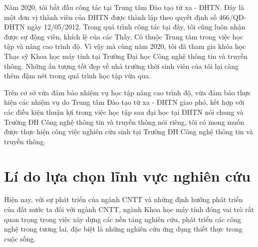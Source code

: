 Năm 2020, tôi bắt đầu công tác tại Trung tâm Đào tạo từ xa - ĐHTN. Đây là một đơn vị thành viên của ĐHTN được thành lập theo quyết định số 466/QĐ-ĐHTN ngày 12/05/2012. Trong quá trình công tác tại đây, tôi cũng luôn nhận được sự động viên, khích lệ của các Thầy, Cô thuộc Trung tâm trong việc học tập và nâng cao trình độ. Vì vậy mà cùng năm 2020, tôi đã tham gia khóa học Thạc sỹ Khoa học máy tính tại Trường Đại học Công nghệ thông tin và truyền thông. Những ấn tượng tốt đẹp về nhà trường thời sinh viên của tôi lại càng thêm đậm nét trong quá trình học tập vừa qua. 

Trên cơ sở vừa đảm bảo nhiệm vụ học tập nâng cao trình độ, vừa đảm bảo thực hiện các nhiệm vụ do Trung tâm Đào tạo từ xa - ĐHTN giao phó, kết hợp với các điều kiện thuận lợi trong việc học tập sau đại học tại ĐHTN nói chung và Trường ĐH Công nghệ thông tin và truyền thông nói riêng, tôi có mong muốn được thực hiện công việc nghiên cứu sinh tại Trường ĐH Công nghệ thông tin và truyền thông. 

\section{Lí do lựa chọn lĩnh vực nghiên cứu}
Hiện nay, với sự phát triển của ngành CNTT và những định hướng phát triển của đất nước ta đối với ngành CNTT, ngành Khoa học máy tính đóng vai trò rất quan trọng trong việc xây dựng các nền tảng nghiên cứu, phát triển các công nghệ trong tương lai, đặc biệt là những nghiên cứu ứng dụng thiết thực trong cuộc sống.